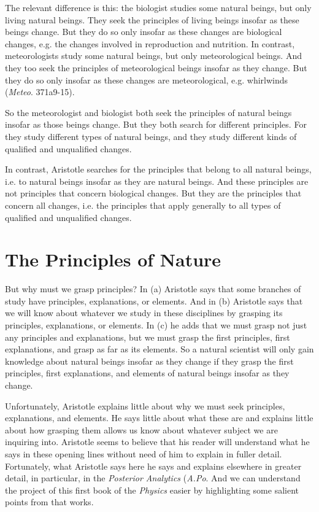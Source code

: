 \documentclass[10pt, oneside]{book}
\begin{document}
The relevant difference is this: the biologist studies some natural beings, but only living natural beings. They seek the principles of living beings insofar as these beings change. But they do so only insofar as these changes are biological changes, e.g. the changes involved in reproduction and nutrition. In contrast, meteorologists study some natural beings, but only meteorological beings. And they too seek the principles of meteorological beings insofar as they change. But they do so only insofar as these changes are meteorological, e.g.  whirlwinds (\emph{Meteo}. 371a9-15).

So the meteorologist and biologist both seek the principles of natural beings insofar as those beings change. But they both search for different principles. For they study different types of natural beings, and they study different kinds of qualified and unqualified changes.

In contrast, Aristotle searches for the principles that belong to all natural beings, i.e. to natural beings insofar as they are natural beings. And these principles are not principles that concern biological changes. But they are the principles that concern all changes, i.e. the principles that apply generally to all types of qualified and unqualified changes.  

\section{The Principles of Nature}

But why must we grasp principles? In (a) Aristotle says that some branches of study have principles, explanations, or elements. And  in (b) Aristotle says  that we will know about whatever we study in these disciplines by grasping its principles, explanations, or elements. In (c) he adds that we must grasp not just any principles and explanations, but we must grasp the first principles, first explanations, and grasp as far as its elements. So a natural scientist will only gain knowledge about natural beings insofar as they change if they grasp the first principles, first explanations, and elements of natural beings insofar as they change.

Unfortunately, Aristotle explains little about why we must seek principles, explanations, and elements. He says little about what these are and explains little about how grasping them allows us know about whatever subject we are inquiring into. Aristotle seems to believe that his reader will understand what he says in these opening lines without need of him to explain in fuller detail. Fortunately, what Aristotle says here he says and explains elsewhere in greater detail, in particular, in the \emph{Posterior Analytics} (\emph{A.Po}.  And we can understand the project of this first book of the \emph{Physics} easier by highlighting some salient points from that works.  
\end{document}

